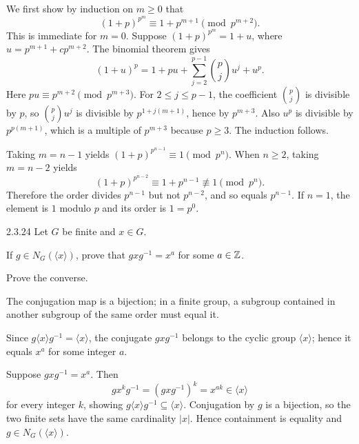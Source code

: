 \documentclass[11pt,oneside]{article}
\begin{document}
\begin{solution}
We first show by induction on $m\ge0$ that
\[
 (1+p)^{p^m}\equiv1+p^{m+1}\pmod{p^{m+2}}.
\]
This is immediate for $m=0$. Suppose $(1+p)^{p^m}=1+u$, where $u=p^{m+1}+cp^{m+2}$. The binomial theorem gives
\[
(1+u)^p=1+pu+\sum_{j=2}^{p-1}\binom pj u^j+u^p.
\]
Here $pu\equiv p^{m+2}\pmod{p^{m+3}}$. For $2\le j\le p-1$, the coefficient $\binom pj$ is divisible by $p$, so $\binom pj u^j$ is divisible by $p^{1+j(m+1)}$, hence by $p^{m+3}$. Also $u^p$ is divisible by $p^{p(m+1)}$, which is a multiple of $p^{m+3}$ because $p\ge3$. The induction follows.

Taking $m=n-1$ yields $(1+p)^{p^{n-1}}\equiv1\pmod{p^n}$. When $n\ge2$, taking $m=n-2$ yields
\[
(1+p)^{p^{n-2}}\equiv1+p^{n-1}\not\equiv1\pmod{p^n}.
\]
Therefore the order divides $p^{n-1}$ but not $p^{n-2}$, and so equals $p^{n-1}$. If $n=1$, the element is $1$ modulo $p$ and its order is $1=p^0$.
\end{solution}

\begin{exercise}{2.3.24}
Let $G$ be finite and $x\in G$.
\begin{exercisesubparts}
\item If $g\in N_G(\langle x\rangle)$, prove that $gxg^{-1}=x^a$ for some $a\in\mathbb{Z}$.
\item Prove the converse.
\end{exercisesubparts}
\end{exercise}

\begin{hint}
The conjugation map is a bijection; in a finite group, a subgroup contained in another subgroup of the same order must equal it.
\end{hint}

\begin{solution}
\begin{exercisesubparts}
\item Since $g\langle x\rangle g^{-1}=\langle x\rangle$, the conjugate $gxg^{-1}$ belongs to the cyclic group $\langle x\rangle$; hence it equals $x^a$ for some integer $a$.
\item Suppose $gxg^{-1}=x^a$. Then
\[
 gx^kg^{-1}=(gxg^{-1})^k=x^{ak}\in\langle x\rangle
\]
for every integer $k$, showing $g\langle x\rangle g^{-1}\subseteq\langle x\rangle$. Conjugation by $g$ is a bijection, so the two finite sets have the same cardinality $|x|$. Hence containment is equality and $g\in N_G(\langle x\rangle)$.
\end{exercisesubparts}
\end{solution}
\end{document}

